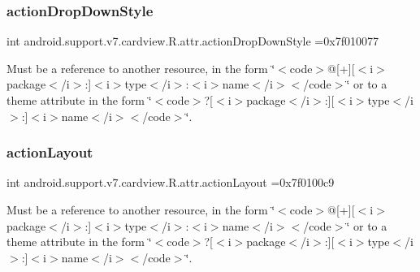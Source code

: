 \subsubsection{\texorpdfstring{action\+Drop\+Down\+Style}{actionDropDownStyle}}
{\footnotesize\ttfamily int android.\+support.\+v7.\+cardview.\+R.\+attr.\+action\+Drop\+Down\+Style =0x7f010077\hspace{0.3cm}{\ttfamily [static]}}

Must be a reference to another resource, in the form \char`\"{}$<$code$>$@\mbox{[}+\mbox{]}\mbox{[}$<$i$>$package$<$/i$>$\+:\mbox{]}$<$i$>$type$<$/i$>$\+:$<$i$>$name$<$/i$>$$<$/code$>$\char`\"{} or to a theme attribute in the form \char`\"{}$<$code$>$?\mbox{[}$<$i$>$package$<$/i$>$\+:\mbox{]}\mbox{[}$<$i$>$type$<$/i$>$\+:\mbox{]}$<$i$>$name$<$/i$>$$<$/code$>$\char`\"{}. \mbox{\label{classandroid_1_1support_1_1v7_1_1cardview_1_1R_1_1attr_a59e5c3de19788e52be3769f63ce16173}} 
\subsubsection{\texorpdfstring{action\+Layout}{actionLayout}}
{\footnotesize\ttfamily int android.\+support.\+v7.\+cardview.\+R.\+attr.\+action\+Layout =0x7f0100c9\hspace{0.3cm}{\ttfamily [static]}}

Must be a reference to another resource, in the form \char`\"{}$<$code$>$@\mbox{[}+\mbox{]}\mbox{[}$<$i$>$package$<$/i$>$\+:\mbox{]}$<$i$>$type$<$/i$>$\+:$<$i$>$name$<$/i$>$$<$/code$>$\char`\"{} or to a theme attribute in the form \char`\"{}$<$code$>$?\mbox{[}$<$i$>$package$<$/i$>$\+:\mbox{]}\mbox{[}$<$i$>$type$<$/i$>$\+:\mbox{]}$<$i$>$name$<$/i$>$$<$/code$>$\char`\"{}. \mbox{\label{classandroid_1_1support_1_1v7_1_1cardview_1_1R_1_1attr_a7783040bfbf3c10e09ddbe6af9e98989}} 

